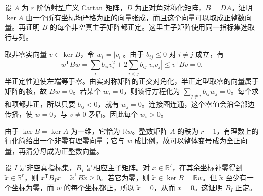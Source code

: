 \begin{exercise}\label{b5:ex:G-positive-affine-kernel}
	设 \(A\) 为 \(r\) 阶仿射型广义 Cartan 矩阵，\(D\) 为正对角对称化矩阵，\(B=DA\)。证明 \(\ker A\) 由一个所有坐标均严格为正的向量张成，而且这个向量可以取成正整数向量。再证明 \(B\) 的每个非空真主子矩阵都正定。这里主子矩阵使用同一指标集选取行与列。
\end{exercise}
\begin{solution}
	取非零实向量 \(v\in\ker B\)，令 \(w_i=|v_i|\)。由于 \(b_{ij}\le0\) 对 \(i\ne j\) 成立，有
	\[
		w^{\mathsf T}Bw
		=\sum_i b_{ii}v_i^2+2\sum_{i<j}b_{ij}|v_iv_j|
		\le v^{\mathsf T}Bv=0.
	\]
	半正定性迫使左端等于零。由实对称矩阵的正交对角化，半正定型取零的向量属于矩阵的核，故 \(Bw=0\)。若某个 \(w_i=0\)，则该行方程化为 \(\sum_{j\ne i}b_{ij}w_j=0\)。每个求和项都非正，所以只要 \(b_{ij}<0\)，就有 \(w_j=0\)。连接图连通，这个零值会沿全部边传播，使 \(w=0\)，与 \(v\ne0\) 矛盾。因此每个 \(w_i>0\)。

	由于 \(\ker B=\ker A\) 为一维，它恰为 \(\mathbb Rw\)。整数矩阵 \(A\) 的秩为 \(r-1\)，有理数上的行化简给出一个非零有理零向量；它与 \(w\) 成比例，故可以整体变号成为全正向量，再清分母成为正整数向量。

	设 \(I\) 是非空真指标集，\(B_I\) 是相应主子矩阵。对 \(x\in\mathbb R^I\)，在其余坐标补零得到 \(\widetilde x\in\mathbb R^r\)，则 \(x^{\mathsf T}B_Ix=\widetilde x^{\mathsf T}B\widetilde x\ge0\)。若它为零，则 \(\widetilde x\in\ker B=\mathbb Rw\)。但 \(\widetilde x\) 至少有一个坐标为零，而 \(w\) 的每个坐标都正，所以 \(\widetilde x=0\)，从而 \(x=0\)。这证明 \(B_I\) 正定。
\end{solution}



